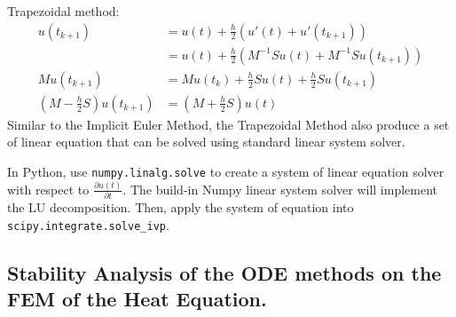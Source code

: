 \documentclass{article}
\begin{document}
Trapezoidal method:
\begin{align}
  u(t_{k+1}) &= u(t) + \frac{h}{2} \left(u'(t) + u'(t_{k+1}) \right) \\
             &= u(t) + \frac{h}{2} \left( M^{-1} S u(t) + M^{-1} S u(t_{k+1}) \right) \\
  M u(t_{k+1}) &= M u(t_k) + \frac{h}{2} S u(t) + \frac{h}{2} S u(t_{k+1}) \\
  \left(M - \frac{h}{2}S \right) u(t_{k+1}) &= \left( M + \frac{h}{2}S \right) u(t) \label{eqn:w2:derived-trapezoidal-method}
\end{align}
Similar to the Implicit Euler Method, the Trapezoidal Method also produce a set of linear equation that can be solved using standard linear system solver.

In Python, use \texttt{numpy.linalg.solve} to create a system of linear equation solver with respect to $\frac{\partial u(t)}{\partial t}$. The build-in Numpy linear system solver will implement the LU decomposition. Then, apply the system of equation into \texttt{scipy.integrate.solve\_ivp}.


\subsection{Stability Analysis of the ODE methods on the FEM of the Heat Equation.}%
\label{sub:Stability Analysis of the ODE methods on the FEM of the Heat Equation.}
\end{document}

